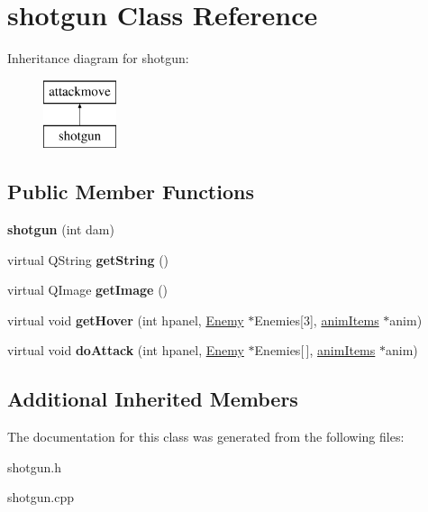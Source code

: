 \hypertarget{classshotgun}{\section{shotgun Class Reference}
\label{classshotgun}
}
Inheritance diagram for shotgun\-:\begin{figure}[H]
\begin{center}
\leavevmode
\includegraphics[height=2.000000cm]{classshotgun}
\end{center}
\end{figure}
\subsection*{Public Member Functions}
\begin{DoxyCompactItemize}
\item 
\hypertarget{classshotgun_adbc12267b0204869263cd2813fb6ccc1}{{\bfseries shotgun} (int dam)}\label{classshotgun_adbc12267b0204869263cd2813fb6ccc1}

\item 
\hypertarget{classshotgun_a856fa8335ee3c2bb8603e83aa5629e5c}{virtual Q\-String {\bfseries get\-String} ()}\label{classshotgun_a856fa8335ee3c2bb8603e83aa5629e5c}

\item 
\hypertarget{classshotgun_a1336af80f8d3f7d19ac954f2e616a1b0}{virtual Q\-Image {\bfseries get\-Image} ()}\label{classshotgun_a1336af80f8d3f7d19ac954f2e616a1b0}

\item 
\hypertarget{classshotgun_a8334202fd30d71432db7e58fca7a462e}{virtual void {\bfseries get\-Hover} (int hpanel, \hyperlink{class_enemy}{Enemy} $\ast$Enemies\mbox{[}3\mbox{]}, \hyperlink{classanim_items}{anim\-Items} $\ast$anim)}\label{classshotgun_a8334202fd30d71432db7e58fca7a462e}

\item 
\hypertarget{classshotgun_a38d2c751cb6f3bed896d8d71c5354de5}{virtual void {\bfseries do\-Attack} (int hpanel, \hyperlink{class_enemy}{Enemy} $\ast$Enemies\mbox{[}$\,$\mbox{]}, \hyperlink{classanim_items}{anim\-Items} $\ast$anim)}\label{classshotgun_a38d2c751cb6f3bed896d8d71c5354de5}

\end{DoxyCompactItemize}
\subsection*{Additional Inherited Members}


The documentation for this class was generated from the following files\-:\begin{DoxyCompactItemize}
\item 
shotgun.\-h\item 
shotgun.\-cpp\end{DoxyCompactItemize}
